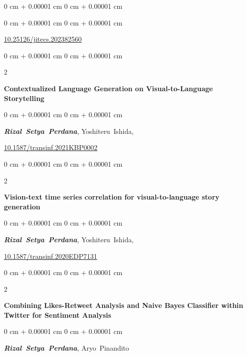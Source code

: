 \documentclass[10pt, letterpaper]{article}
\newenvironment{onecolentry}{
    \begin{adjustwidth}{
        0 cm + 0.00001 cm
    }{
        0 cm + 0.00001 cm
    }
}{
    \end{adjustwidth}
} %
\newenvironment{twocolentry}[2][]{
    \onecolentry
    \def\secondColumn{#2}
    \setcolumnwidth{\fill, 4.5 cm}
    \begin{paracol}{2}
}{
    \switchcolumn \raggedleft \secondColumn
    \end{paracol}
    \endonecolentry
} %
\begin{document}
\begin{onecolentry}
\begin{samepage}
\begin{onecolentry}
                \vspace{0.10 cm}
                \href{https://doi.org/10.25126/jitecs.202382560}{10.25126/jitecs.202382560}
            \end{onecolentry}
        \end{samepage}

        
        \vspace{0.3 cm}
        \begin{samepage}
            \begin{twocolentry}{2022}
                \textbf{Contextualized Language Generation on Visual-to-Language Storytelling}
            \end{twocolentry}
            \vspace{0.10 cm}
            \begin{onecolentry}
                 \mbox{\textbf{\textit{Rizal Setya Perdana}}},
                 \mbox{Yoshiteru Ishida},
                \vspace{0.10 cm}
                
                \href{https://doi.org/10.1587/transinf.2021KBP0002}{10.1587/transinf.2021KBP0002}
            \end{onecolentry}
        \end{samepage}
        \vspace{0.3 cm}
        \begin{samepage}
            \begin{twocolentry}{2021}
                \textbf{Vision-text time series correlation for visual-to-language story generation}
            \end{twocolentry}
            \vspace{0.10 cm}
            \begin{onecolentry}
                 \mbox{\textbf{\textit{Rizal Setya Perdana}}},
                 \mbox{Yoshiteru Ishida},
                \vspace{0.10 cm}
                
                \href{https://doi.org/10.1587/transinf.2020EDP7131}{10.1587/transinf.2020EDP7131}
            \end{onecolentry}
        \end{samepage}

        \vspace{0.3 cm}
        \begin{samepage}
            \begin{twocolentry}{2018}
                \textbf{Combining Likes-Retweet Analysis and Naive Bayes Classifier within Twitter for Sentiment Analysis}
            \end{twocolentry}
            \vspace{0.10 cm}
            \begin{onecolentry}
                \mbox{\textbf{\textit{Rizal Setya Perdana}}}, 
                \mbox{Aryo Pinandito}
                

\end{onecolentry}
\end{samepage}
\end{onecolentry}
\end{document}
